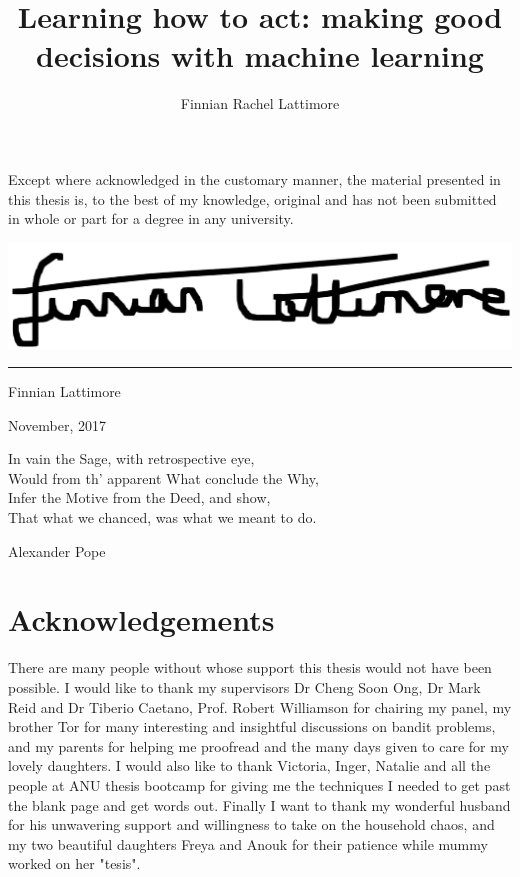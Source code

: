 \documentclass[11pt,a4paper,twoside]{report}
\author{Finnian Rachel Lattimore}
\title{Learning how to act: making good decisions with machine learning}
\theoremstyle{plain}
\theoremstyle{definition}
\newcommand{\ci}{\mathrel{\perp\mspace{-10mu}\perp}}
\begin{document}



\clearpage
\vspace*{\fill}
\begin{center}
\begin{minipage}{.9\textwidth}
Except where acknowledged in the customary manner, the material 
presented in this thesis is, to the best of my knowledge, original and has not been submitted in whole or part for a degree in any 
university.

\vspace{40mm}  %
\hspace{80mm}\includegraphics[scale=.1]{sig}
\vspace{.1mm}
\hspace{80mm}\rule{40mm}{.15mm}\par   %
\hspace{80mm} Finnian Lattimore\par
\hspace{80mm} November, 2017
\end{minipage}
\end{center}
\vfill %
\clearpage
%

\epigraph{In vain the Sage, with retrospective eye,\\
Would from th' apparent What conclude the Why,\\
Infer the Motive from the Deed, and show,\\
That what we chanced, was what we meant to do.}{Alexander Pope}

\chapter*{Acknowledgements}

There are many people without whose support this thesis would not have been possible. I would like to thank my supervisors Dr Cheng Soon Ong, Dr Mark Reid and Dr Tiberio Caetano, Prof. Robert Williamson for chairing my panel, my brother Tor for many interesting and insightful discussions on bandit problems, and my parents for helping me proofread and the many days given to care for my lovely daughters. I would also like to thank Victoria, Inger, Natalie and all the people at ANU thesis bootcamp for giving me the techniques I needed to get past the blank page and get words out. Finally I want to thank my wonderful husband for his unwavering support and willingness to take on the household chaos, and my two beautiful daughters Freya and Anouk for their patience while mummy worked on her "tesis". 
\end{document}
